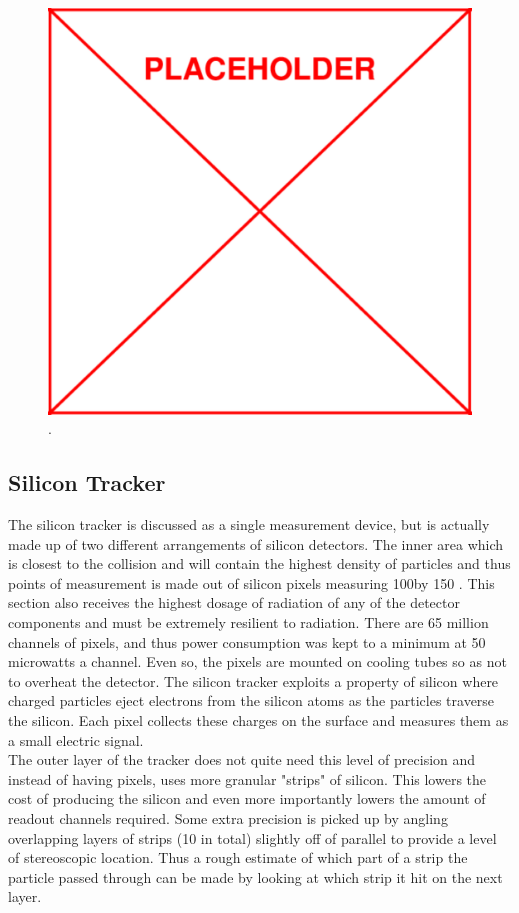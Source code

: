 					\begin{figure}[h]
\begin{center}
\includegraphics[width=0.48\linewidth]{Figs/placeholder.pdf}
\caption{\label{fig:magnet}
.
}
\end{center}
\end{figure}

	\subsection{Silicon Tracker}
	\label{sec:silicon_tracker}
	The silicon tracker is discussed as a single measurement device, but is actually made up of two different arrangements of silicon detectors. The inner area which is closest to the collision and will contain the highest density of particles and thus points of measurement is made out of silicon pixels measuring 100\um by 150 \um. This section also receives the highest dosage of radiation of any of the detector components and must be extremely resilient to radiation. There are 65 million channels of pixels, and thus power consumption was kept to a minimum at 50 microwatts a channel. Even so, the pixels are mounted on cooling tubes so as not to overheat the detector. The silicon tracker exploits a property of silicon where charged particles eject electrons from the silicon atoms as the particles traverse the silicon. Each pixel collects these charges on the surface and measures them as a small electric signal. \\
	
	The outer layer of the tracker does not quite need this level of precision and instead of having pixels, uses more granular "strips" of silicon. This lowers the cost of producing the silicon and even more importantly lowers the amount of readout channels required. Some extra precision is picked up by angling overlapping layers of strips (10 in total) slightly off of parallel to provide a level of stereoscopic location. Thus a rough estimate of which part of a strip the particle passed through can be made by looking at which strip it hit on the next layer.\\
	
